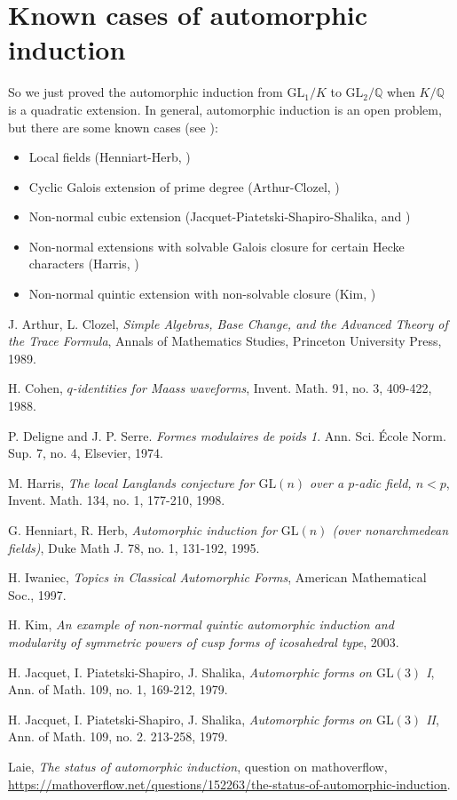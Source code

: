 \documentclass{article}
\newcommand{\GL}{\mathrm{GL}}
\begin{document}
\section{Known cases of automorphic induction}
So we just proved the automorphic induction from $\GL_{1}/K$ to $\GL_{2}/\mathbb{Q}$ when $K/\mathbb{Q}$ is a quadratic extension. In general, automorphic induction is an open problem, but there are some known cases (see \cite{lai}):
\begin{itemize}
\item Local fields (Henniart-Herb, \cite{hen})
\item Cyclic Galois extension of prime degree (Arthur-Clozel, \cite{ar})
\item Non-normal cubic extension (Jacquet-Piatetski-Shapiro-Shalika, \cite{jac1} and \cite{jac2})
\item Non-normal extensions with solvable Galois closure for certain Hecke characters (Harris, \cite{har})
\item Non-normal quintic extension with non-solvable closure (Kim, \cite{kim})
\end{itemize}





\begin{thebibliography}{5}
 J. Arthur, L. Clozel, \emph{Simple Algebras, Base Change, and the Advanced Theory of the Trace Formula}, Annals of Mathematics Studies, Princeton University Press, 1989. 

 H. Cohen, \emph{$q$-identities for Maass waveforms}, Invent. Math. 91, no. 3, 409-422, 1988. 

 P. Deligne and J. P. Serre. \emph{Formes modulaires de poids 1}. Ann. Sci. \'Ecole Norm. Sup. 7, no. 4, Elsevier, 1974.

 M. Harris, \emph{The local Langlands conjecture for $\GL(n)$ over a $p$-adic field, $n<p$}, Invent. Math. 134, no. 1, 177-210, 1998. 


 G. Henniart, R. Herb, \emph{Automorphic induction for $\GL(n)$ (over nonarchmedean fields)}, Duke Math J. 78, no. 1, 131-192, 1995. 

 H. Iwaniec, \emph{Topics in Classical Automorphic Forms}, American Mathematical Soc., 1997. 

 H. Kim, \emph{An example of non-normal quintic automorphic induction and modularity of symmetric powers of cusp forms of icosahedral type}, 2003. 

 H. Jacquet, I. Piatetski-Shapiro, J. Shalika, \emph{Automorphic forms on $\GL(3)$ I},  Ann. of Math. 109, no. 1, 169-212, 1979. 

 H. Jacquet, I. Piatetski-Shapiro, J. Shalika, \emph{Automorphic forms on $\GL(3)$ II},  Ann. of Math. 109, no. 2. 213-258, 1979.


 Laie, \emph{The status of automorphic induction}, question on mathoverflow, \url{https://mathoverflow.net/questions/152263/the-status-of-automorphic-induction}. 



\end{thebibliography}
\end{document}
